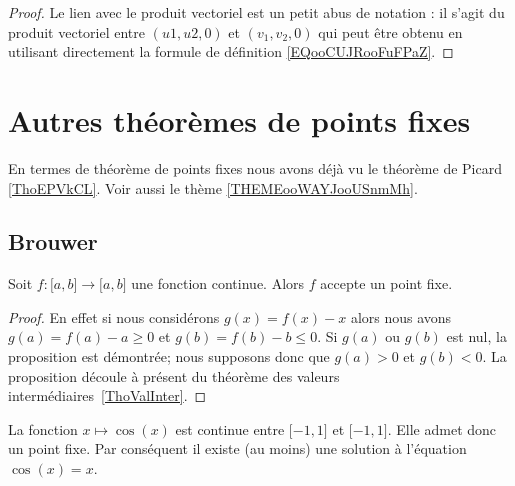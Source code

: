 \begin{proof}
	Le lien avec le produit vectoriel est un petit abus de notation : il s'agit du produit vectoriel entre \( (u1, u2, 0)\) et \( (v_1,v_2,0)\) qui peut être obtenu en utilisant directement la formule de définition \eqref{EQooCUJRooFuFPaZ}.
\end{proof}

\section{Autres théorèmes de points fixes}
\label{SECooDWMPooWZgzRZ}

En termes de théorème de points fixes nous avons déjà vu le théorème de Picard \ref{ThoEPVkCL}. Voir aussi le thème \ref{THEMEooWAYJooUSnmMh}.

\subsection{Brouwer}
\label{subSecZCCmMnQ}

\begin{proposition}
	Soit \( f\colon \mathopen[ a , b \mathclose]\to \mathopen[ a , b \mathclose]\) une fonction continue. Alors \( f\) accepte un point fixe.
\end{proposition}

\begin{proof}
	En effet si nous considérons \( g(x)=f(x)-x\) alors nous avons \( g(a)=f(a)-a\geq 0\) et \( g(b)=f(b)-b\leq 0\). Si \( g(a)\) ou \( g(b)\) est nul, la proposition est démontrée; nous supposons donc que \( g(a)>0\) et \( g(b)<0\). La proposition découle à présent du théorème des valeurs intermédiaires~\ref{ThoValInter}.
\end{proof}

\begin{example}
	La fonction \( x\mapsto\cos(x)\) est continue entre \( \mathopen[ -1 , 1 \mathclose]\) et \( \mathopen[ -1 , 1 \mathclose]\). Elle admet donc un point fixe. Par conséquent il existe (au moins) une solution à l'équation \( \cos(x)=x\).
\end{example}


